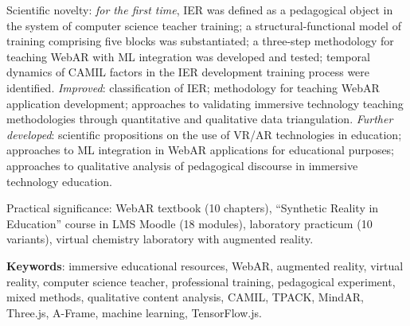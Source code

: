Scientific novelty: \textit{for the first time}, IER was defined as a pedagogical object in the system of computer science teacher training; a structural-functional model of training comprising five blocks was substantiated; a three-step methodology for teaching WebAR with ML integration was developed and tested; temporal dynamics of CAMIL factors in the IER development training process were identified. \textit{Improved}: classification of IER; methodology for teaching WebAR application development; approaches to validating immersive technology teaching methodologies through quantitative and qualitative data triangulation. \textit{Further developed}: scientific propositions on the use of VR/AR technologies in education; approaches to ML integration in WebAR applications for educational purposes; approaches to qualitative analysis of pedagogical discourse in immersive technology education.

Practical significance: WebAR textbook (10 chapters), ``Synthetic Reality in Education'' course in LMS Moodle (18 modules), laboratory practicum (10 variants), virtual chemistry laboratory with augmented reality.

\textbf{Keywords}: immersive educational resources, WebAR, augmented reality, virtual reality, computer science teacher, professional training, pedagogical experiment, mixed methods, qualitative content analysis, CAMIL, TPACK, MindAR, Three.js, A-Frame, machine learning, TensorFlow.js.

\printpratsi{}
